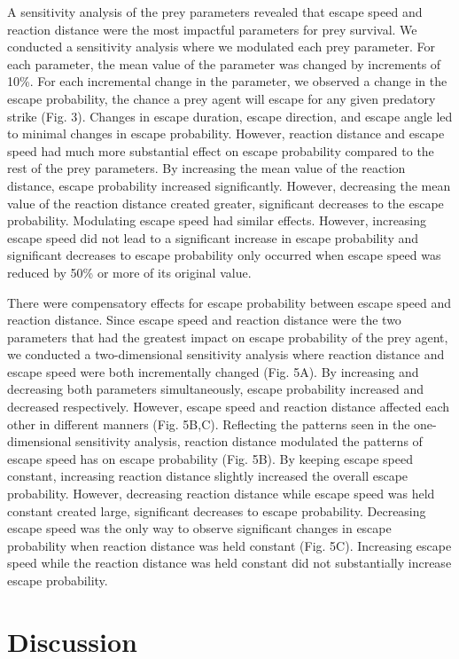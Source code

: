 \documentclass[]{rsos}%
\begin{document}
A sensitivity analysis of the prey parameters revealed that escape speed and reaction distance were the most impactful parameters for prey survival. We conducted a sensitivity analysis where we modulated each prey parameter. For each parameter, the mean value of the parameter was changed by increments of 10\%. For each incremental change in the parameter, we observed a change in the escape probability, the chance a prey agent will escape for any given predatory strike (Fig. 3). Changes in escape duration, escape direction, and escape angle led to minimal changes in escape probability. However, reaction distance and escape speed had much more substantial effect on escape probability compared to the rest of the prey parameters. By increasing the mean value of the reaction distance, escape probability increased significantly. However, decreasing the mean value of the reaction distance created greater, significant decreases to the escape probability. Modulating escape speed had similar effects. However, increasing escape speed did not lead to a significant increase in escape probability and significant decreases to escape probability only occurred when escape speed was reduced by 50\% or more of its original value.

There were compensatory effects for escape probability between escape speed and reaction distance. Since escape speed and reaction distance were the two parameters that had the greatest impact on escape probability of the prey agent, we conducted a two-dimensional sensitivity analysis where reaction distance and escape speed were both incrementally changed (Fig. 5A). By increasing and decreasing both parameters simultaneously, escape probability increased and decreased respectively. However, escape speed and reaction distance affected each other in different manners (Fig. 5B,C). Reflecting the patterns seen in the one-dimensional sensitivity analysis, reaction distance modulated the patterns of escape speed has on escape probability (Fig. 5B). By keeping escape speed constant, increasing reaction distance slightly increased the overall escape probability. However, decreasing reaction distance while escape speed was held constant created large, significant decreases to escape probability. Decreasing escape speed was the only way to observe significant changes in escape probability when reaction distance was held constant (Fig. 5C).  Increasing escape speed while the reaction distance was held constant did not substantially increase escape probability. 


\section{Discussion}
\end{document}
